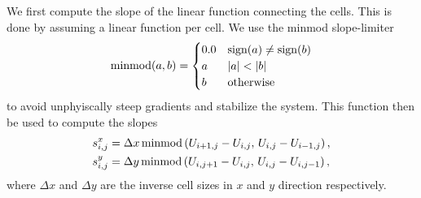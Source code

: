 We first compute the slope of the linear function connecting the cells.
This is done by assuming a linear function per cell.
We use the minmod slope-limiter
\begin{equation}
  \label{eq:minmod}
  \operatorname{minmod}(a, b) =
  \begin{cases}
    0.0 & \sign(a) \neq \sign(b) \\
      a & \vert a \vert < \vert b \vert \\
      b & \text{otherwise}
  \end{cases}
\end{equation}
to avoid unphyiscally steep gradients and stabilize the system.
This function then be used to compute the slopes
\begin{align}\label{eq:slopes}
  \begin{split}
   \slope{x} &=  \Delta x \minmod \left( \cellAvg[i+1,j] - \cellAvg[i,j], \, \cellAvg[i,j] - \cellAvg[i-1, j] \right),\\ 
   \slope{y} &=  \Delta y \minmod \left( \cellAvg[i,j+1] - \cellAvg[i,j], \, \cellAvg[i,j] - \cellAvg[i, j-1] \right),
   \end{split}
\end{align}
where $\Delta x$ and $\Delta y$ are the inverse cell sizes in $x$ and $y$ direction respectively.

